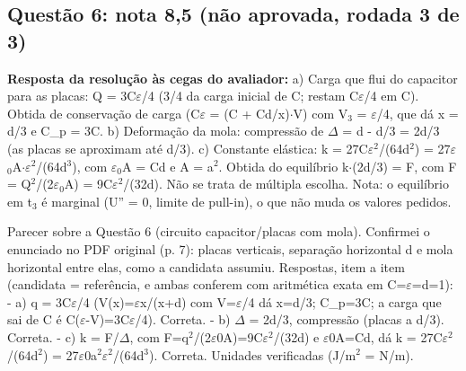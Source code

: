 \documentclass{article}%
\begin{document}
\subsection*{Questão 6: nota 8,5 (não aprovada, rodada 3 de 3)}%
\textbf{Resposta da resolução às cegas do avaliador:} a) Carga que flui do capacitor para as placas: Q = 3C$\varepsilon$/4 (3/4 da carga inicial de C; restam C$\varepsilon$/4 em C). Obtida de conservação de carga (C$\varepsilon$ = (C + Cd/x)$\cdot$V) com V$_{3}$ = $\varepsilon$/4, que dá x = d/3 e C\_p = 3C.\newline%
\newline%
b) Deformação da mola: compressão de $\Delta$ = d - d/3 = 2d/3 (as placas se aproximam até d/3).\newline%
\newline%
c) Constante elástica: k = 27C$\varepsilon$$^2$/(64d$^2$) = 27$\varepsilon$$_{0}$A$\cdot$$\varepsilon$$^2$/(64d$^3$), com $\varepsilon$$_{0}$A = Cd e A = a$^2$. Obtida do equilíbrio k$\cdot$(2d/3) = F, com F = Q$^2$/(2$\varepsilon$$_{0}$A) = 9C$\varepsilon$$^2$/(32d).\newline%
\newline%
Não se trata de múltipla escolha. Nota: o equilíbrio em t$_{3}$ é marginal (U'' = 0, limite de pull{-}in), o que não muda os valores pedidos.\par %
Parecer sobre a Questão 6 (circuito capacitor/placas com mola). Confirmei o enunciado no PDF original (p. 7): placas verticais, separação horizontal d e mola horizontal entre elas, como a candidata assumiu.\newline%
\newline%
Respostas, item a item (candidata = referência, e ambas conferem com aritmética exata em C=$\varepsilon$=d=1):\newline%
{-} a) q = 3C$\varepsilon$/4 (V(x)=$\varepsilon$x/(x+d) com V=$\varepsilon$/4 dá x=d/3; C\_p=3C; a carga que sai de C é C($\varepsilon$-V)=3C$\varepsilon$/4). Correta.\newline%
{-} b) $\Delta$ = 2d/3, compressão (placas a d/3). Correta.\newline%
{-} c) k = F/$\Delta$, com F=q$^2$/(2$\varepsilon$0A)=9C$\varepsilon$$^2$/(32d) e $\varepsilon$0A=Cd, dá k = 27C$\varepsilon$$^2$/(64d$^2$) = 27$\varepsilon$0a$^2$$\varepsilon$$^2$/(64d$^3$). Correta. Unidades verificadas (J/m$^2$ = N/m).\newline%
\newline%
$$
\end{document}
